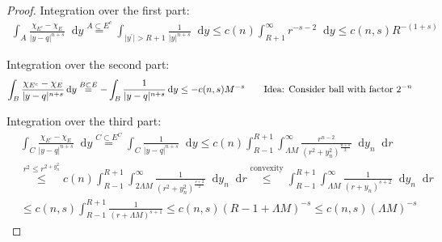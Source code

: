 \documentclass[11pt]{article}
\newcommand*{\dd}[1]{\mathop{}\!\mathrm{d}#1} %
\begin{document}
\begin{proof}
	Integration over the first part:
	\begin{gather*}
		\int_A \frac{\chi_{E^c} -\chi_E}{\lvert y-q\rvert^{n+s}} \dd{y} \overset{A \subset E^c}{ =} \int_{ \lvert y^\prime \rvert > R+1} \frac{1}{\lvert y \rvert^{n+s}} \dd{y} \leq c(n) \int_{R+1}^\infty r^{-s-2} \dd{y} \leq c(n,s) R^{-(1+s)}
	\end{gather*}

	Integration over the second part:
	\begin{gather*}
		\int_B \frac{\chi_{E^c} -\chi_E}{\lvert y-q \rvert^{n+s}} \dd{y} \overset{B \subset E}{ =} - \int_B \frac{1}{\lvert y-q\rvert^{n+s}} \dd{y} \leq -c(n,s) M^{-s} \qquad \text{Idea: Consider ball with factor \( 2^{-n} \)}
	\end{gather*}

	Integration over the third part:
	\begin{align*}
		 & \int_C \frac{\chi_{E^c} -\chi_E}{\lvert y-q\rvert^{n+s}} \dd{y} \overset{C \subset E^C}{ =} \int_C \frac{1}{\lvert y-q\rvert^{n+s}} \dd{y} \leq c(n) \int_{R-1}^{R+1} \int_{\Lambda M}^\infty \frac{r^{n-2}}{(r^2 +y_n^2)^{\frac{n+s}{2}}} \dd{y_n} \dd{r} \\
		 & \overset{r^2 \leq r^{2 + y_n^2}}{ \leq} c(n) \int_{R-1}^{R+1} \int_{2
		\Lambda M}^\infty \frac{1}{(r^2 +y_n^2)^{\frac{s+2}{2}}} \dd{y_n} \dd{r} \overset{\text{convexity}}{\leq} \int_{R-1}^{R+1} \int_{\Lambda M}^\infty \frac{1}{(r+y_n)^{s+2}} \dd{y_n} \dd{r} \\
		 & \leq c(n,s) \int_{R-1}^{R+1} \frac{1}{(r+\Lambda M)^{s+1}} \leq c(n,s)(R-1+\Lambda M)^{-s} \leq c(n,s)(\Lambda M)^{-s}
	\end{align*}


\end{proof}
\end{document}
